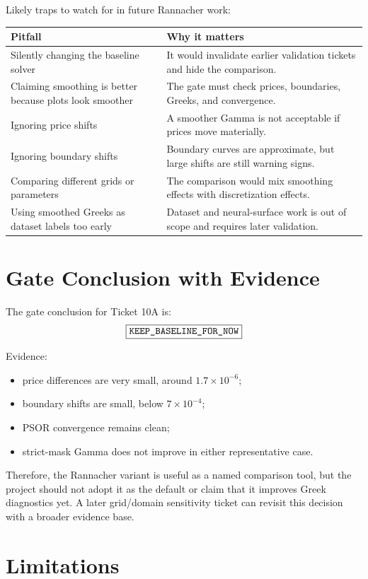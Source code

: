 \documentclass[11pt,a4paper]{article}
\newcommand{\code}[1]{\texttt{#1}}
\begin{document}
Likely traps to watch for in future Rannacher work:
\begin{longtable}{P{0.34\textwidth}L{0.46\textwidth}}
\toprule
Pitfall & Why it matters \\
\midrule
\endhead
Silently changing the baseline solver & It would invalidate earlier validation tickets and hide the comparison. \\
Claiming smoothing is better because plots look smoother & The gate must check prices, boundaries, Greeks, and convergence. \\
Ignoring price shifts & A smoother Gamma is not acceptable if prices move materially. \\
Ignoring boundary shifts & Boundary curves are approximate, but large shifts are still warning signs. \\
Comparing different grids or parameters & The comparison would mix smoothing effects with discretization effects. \\
Using smoothed Greeks as dataset labels too early & Dataset and neural-surface work is out of scope and requires later validation. \\
\bottomrule
\end{longtable}

\section{Gate Conclusion with Evidence}

The gate conclusion for Ticket 10A is:
\[
\boxed{\text{\code{KEEP\_BASELINE\_FOR\_NOW}}}
\]

Evidence:
\begin{itemize}
  \item price differences are very small, around \(1.7\times10^{-6}\);
  \item boundary shifts are small, below \(7\times10^{-4}\);
  \item PSOR convergence remains clean;
  \item strict-mask Gamma does not improve in either representative case.
\end{itemize}

Therefore, the Rannacher variant is useful as a named comparison tool, but the project should not
adopt it as the default or claim that it improves Greek diagnostics yet. A later grid/domain
sensitivity ticket can revisit this decision with a broader evidence base.

\section{Limitations}
\end{document}
